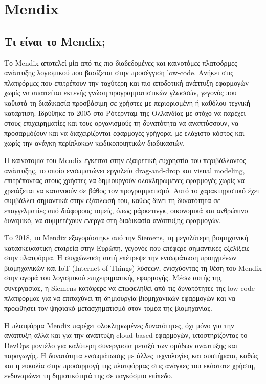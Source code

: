 \chapter{Mendix}

    \section{Τι είναι το Mendix;}
        Το Mendix αποτελεί μία από τις πιο διαδεδομένες και καινοτόμες πλατφόρμες ανάπτυξης λογισμικού που βασίζεται στην προσέγγιση low-code. Ανήκει στις πλατφόρμες που επιτρέπουν την ταχύτερη και πιο αποδοτική ανάπτυξη εφαρμογών χωρίς να απαιτείται εκτενής γνώση προγραμματιστικών γλωσσών, γεγονός που καθιστά τη διαδικασία προσβάσιμη σε χρήστες με περιορισμένη ή καθόλου τεχνική κατάρτιση. Ιδρύθηκε το 2005 στο Ρότερνταμ της Ολλανδίας με στόχο να παρέχει στους επιχειρηματίες και τους οργανισμούς τη δυνατότητα να αναπτύσσουν, να προσαρμόζουν και να διαχειρίζονται εφαρμογές γρήγορα, με ελάχιστο κόστος και χωρίς την ανάγκη περίπλοκων κωδικοποιητικών διαδικασιών.

        Η καινοτομία του Mendix έγκειται στην εξαιρετική ευχρηστία του περιβάλλοντος ανάπτυξης, το οποίο ενσωματώνει εργαλεία drag-and-drop και visual modeling, επιτρέποντας στους χρήστες να δημιουργούν ολοκληρωμένες εφαρμογές χωρίς να χρειάζεται να κατανοούν σε βάθος τον προγραμματισμό. Αυτό το χαρακτηριστικό έχει συμβάλλει σημαντικά στην εξάπλωσή του, καθώς δίνει τη δυνατότητα σε επαγγελματίες από διάφορους τομείς, όπως μάρκετινγκ, οικονομικά και ανθρώπινο δυναμικό, να συμμετέχουν ενεργά στη διαδικασία ανάπτυξης εφαρμογών.

        Το 2018, το Mendix εξαγοράστηκε από την Siemens, τη μεγαλύτερη βιομηχανική κατασκευαστική εταιρεία στην Ευρώπη, γεγονός που επέφερε σημαντικές εξελίξεις στην πλατφόρμα. Η συγχώνευση αυτή επέτρεψε την ενσωμάτωση προηγμένων βιομηχανικών και IoT (Internet of Things) λύσεων, ενισχύοντας τη θέση του Mendix στην αγορά του λογισμικού επιχειρηματικής εφαρμογής. Μέσω αυτής της συνεργασίας, η Siemens κατάφερε να επωφεληθεί από τις δυνατότητες της low-code πλατφόρμας για να επιταχύνει τη δημιουργία βιομηχανικών εφαρμογών και να προωθήσει τον ψηφιακό μετασχηματισμό στον τομέα της βιομηχανίας.

        Η πλατφόρμα Mendix παρέχει ολοκληρωμένες δυνατότητες, όχι μόνο για την ανάπτυξη αλλά και για την ανάπτυξη cloud-based εφαρμογών, υποστηρίζοντας το DevOps μοντέλο για καλύτερη συνεργασία μεταξύ των ομάδων ανάπτυξης και παραγωγής. Η δυνατότητα ενσωμάτωσης με άλλες τεχνολογίες και συστήματα, καθώς και η ευκολία στην προσαρμογή της πλατφόρμας στις ανάγκες του εκάστοτε χρήστη, ενδυναμώνει τη δημοτικότητά της σε παγκόσμιο επίπεδο.


